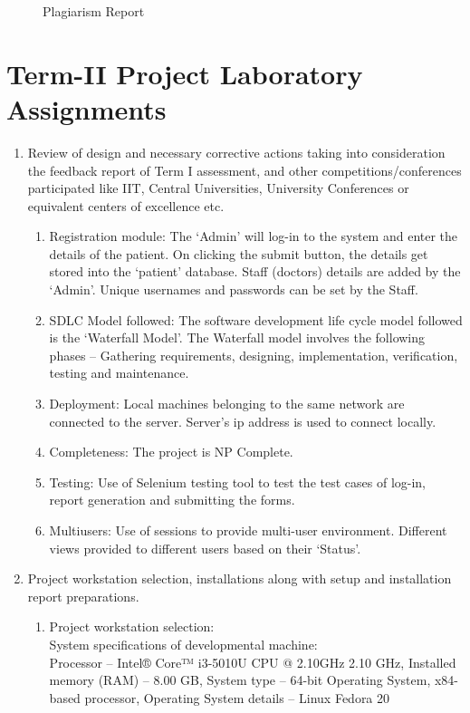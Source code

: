 \documentclass[oneside,a4paper,12pt]{book}
\begin{document}
\begin{appendices}
\begin{center}
\begin{figure}[!htbp]
		
		
	  \caption{Plagiarism Report}
	  \label{fig:Plagiarism Report}
	\end{figure}
\end{center}
\chapter{ Term-II Project Laboratory Assignments}
\begin{enumerate}
\item Review of design and necessary corrective actions taking into consideration the feedback report of Term I assessment, and other competitions/conferences participated like IIT, Central Universities, University Conferences or equivalent centers of excellence etc.

\begin{enumerate}[(i.)]
\item	Registration module: 
The ‘Admin’ will log-in to the system and enter the details of the patient. On clicking the submit button, the details get stored into the ‘patient’ database. 
Staff (doctors) details are added by the ‘Admin’. Unique usernames and passwords can be set by the Staff. 
\item	SDLC Model followed:
The software development life cycle model followed is the ‘Waterfall Model’. The Waterfall model involves the following phases – Gathering requirements, designing, implementation, verification, testing and maintenance.
\item	Deployment:
Local machines belonging to the same network are connected to the server. Server’s ip address is used to connect locally. 
\item	Completeness:
The project is NP Complete. 
\item Testing: 
Use of Selenium testing tool to test the test cases of log-in, report generation and submitting the forms. 
\item	Multiusers:
Use of sessions to provide multi-user environment. Different views provided to different users based on their ‘Status’.

\end{enumerate}

\item Project workstation selection, installations along with setup and installation report preparations.

\begin{enumerate}[(i.)]
\item	Project workstation selection:\\
System specifications of developmental machine: \\
Processor – Intel® Core™ i3-5010U CPU @ 2.10GHz  2.10 GHz,
Installed memory (RAM) – 8.00 GB,
System type – 64-bit Operating System, x84-based processor,
Operating System details – Linux Fedora 20 


\end{enumerate}
\end{enumerate}
\end{appendices}
\end{document}
